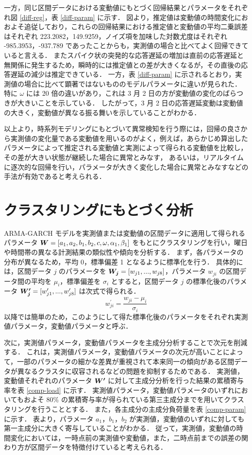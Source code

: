\documentclass[technicalreport]{ieicej}
\begin{document}
一方，同じ区間データにおける変動値にもとづく回帰結果とパラメータをそれぞれ図 \ref{diff-reg}，表 \ref{diff-param} に示す．
図より，推定値は変動値の時間変化におおよそ追従しており，これらの回帰結果における推定値と変動値の平均二乗誤差はそれぞれ 223.2082，149.9259，ノイズ項を加味した対数尤度はそれぞれ -985.3953，-937.789 であったことからも，実測値の場合と比べてよく回帰できていると言える．
またスパイク状の突発的な応答遅延の増加は直前の応答遅延と無関係に発生するため，瞬時的には推定値との差が大きくなるが，その直後の応答遅延の減少は推定できている．
一方，表 \ref{diff-param} に示されるとおり，実測値の場合に比べて顕著ではないもののモデルパラメータに違いが見られた．
特に $\omega$ には 20 倍の違いがあり，これは 3 月 2 日の方が変動値の変化のばらつきが大きいことを示している．
したがって，3 月 2 日の応答遅延変動は変動値の大きく，変動値が異なる振る舞いを示していることがわかる．

以上より，時系列モデリングにもとづいて異常検知を行う際には，回帰の良さから実測値の変化量である変動値を用いるのがよく，例えば，あらかじめ算出したパラメータによって推定される変動値と実測によって得られる変動値を比較し，その差が大きい状態が継続した場合に異常とみなす，
あるいは，リアルタイムに逐次的な回帰を行い，パラメータが大きく変化した場合に異常とみなすなどの手法が有効であると考えられる．

\section{クラスタリングにもとづく分析}
 ARMA-GARCH モデルを実測値または変動値の区間データに適用して得られるパラメータ $\mbox{\boldmath $W$} = [a_1, a_2, b_1, b_2, c, \omega, \alpha_1, \beta_1]$ をもとにクラスタリングを行い，曜日や時間帯の異なる計測結果の類似性や傾向を分析する．
 まず，各パラメータの分布が異なるため，平均 0，標準偏差 1 となるように標準化を行う．
具体的には，区間データ $j$ のパラメータを $\mbox{\boldmath $W_j$} = [w_{j1},...,w_{j8}]$，パラメータ $w_{ji}$ の区間データ間の平均を $\mu_i$，標準偏差を $\sigma_i$ とすると，区間データ $j$ の標準化後のパラメータ $\mbox{\boldmath $W_j^\prime$} = [w_{j1}^\prime,...,w_{j8}^\prime]$ は次式で得られる．
$$w_{ji}^\prime = \frac{w_{ji} - \mu_i}{\sigma_i}$$
以降では簡単のため，このようにして得た標準化後のパラメータをそれぞれ実測値パラメータ，変動値パラメータと呼ぶ． 

次に，実測値パラメータ，変動値パラメータを主成分分析\cite{jolliffe2016principal}することで次元を削減する．
これは，実測値パラメータ，変動値パラメータの次元が高いことによって，一部のパラメータの細かな差異が重視されて本来同一の傾向がある区間データが異なるクラスタに収容されるなどの問題を抑制するためである．
実測値，変動値それぞれのパラメータ $\mbox{\boldmath $W^\prime$}$ に対して主成分分析を行った結果の累積寄与率を表 \ref{comp-load} に示す．
実測値パラメータ，変動値パラメータのいずれにおいてもおよそ $80\%$ の累積寄与率が得られている第三主成分までを用いてクラスタリングを行うこととする．
また，各主成分の主成分負荷量を表 \ref{comp-param} に示す．
表より，パラメータ $a_1，b_1，b_2$ が実測値，変動値のいずれに対しても第一主成分に大きく寄与していることがわかる．
従って，実測値，変動値の時間変化においては，一時点前の実測値や変動値，また，二時点前までの誤差の関わり方が区間データを特徴付けていると考えられる．
\end{document}
